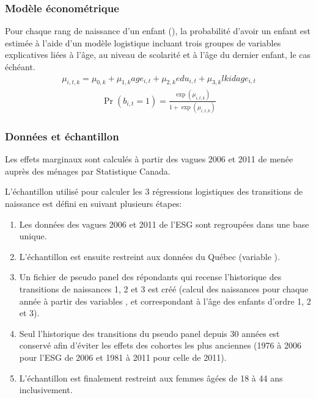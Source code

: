 \documentclass[letterpaper,10pt,french]{sphinxmanual}
\begin{document}
\subsubsection{Modèle économétrique}
\label{\detokenize{methodologie:modele-econometrique}}
Pour chaque rang de naissance d’un enfant (), la probabilité d’avoir un enfant est estimée à l’aide d’un modèle logistique
incluant trois groupes de variables explicatives liées à l’âge, au niveau de scolarité et à l’âge du dernier enfant, le cas échéant.
\begin{equation*}
\begin{split}\mu_{i,t,k} = \mu_{0,k} + \mu_{1,k} age_{i,t} + \mu_{2,k} edu_{i,t} + \mu_{3,k} lkidage_{i,t}\end{split}
\end{equation*}\begin{equation*}
\begin{split}\Pr(b_{i,t}=1) = \frac{\exp(\mu_{i,t,k})}{1+\exp(\mu_{i,t,k})}\end{split}
\end{equation*}

\subsubsection{Données et échantillon}
\label{\detokenize{methodologie:donnees-et-echantillon}}
Les effets marginaux sont calculés à partir des vagues 2006 et 2011 de
 menée auprès des ménages
par Statistique Canada.

L’échantillon utilisé pour calculer les 3 régressions logistiques des transitions de naissance est défini en suivant plusieurs étapes:
\begin{enumerate}
%
\item {} 
Les données des vagues 2006 et 2011 de l’ESG sont regroupées dans une base unique.

\item {} 
L’échantillon est ensuite restreint aux données du Québec (variable ).

\item {} 
Un fichier de pseudo panel des répondants qui recense l’historique des transitions de naissances 1, 2 et 3 est créé (calcul des naissances pour chaque année à partir des variables ,  et  correspondant à l’âge des enfants d’ordre 1, 2 et 3).

\item {} 
Seul l’historique des transitions du pseudo panel depuis 30 années est conservé afin d’éviter les effets des cohortes les plus anciennes
(1976 à 2006 pour l’ESG de 2006 et 1981 à 2011 pour celle de 2011).

\item {} 
L’échantillon est finalement restreint aux femmes âgées de 18 à 44 ans inclusivement.

\end{enumerate}
\end{document}
